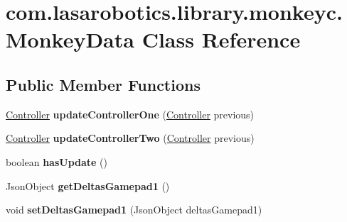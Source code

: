 \hypertarget{classcom_1_1lasarobotics_1_1library_1_1monkeyc_1_1_monkey_data}{}\section{com.\+lasarobotics.\+library.\+monkeyc.\+Monkey\+Data Class Reference}
\label{classcom_1_1lasarobotics_1_1library_1_1monkeyc_1_1_monkey_data}
\subsection*{Public Member Functions}
\begin{DoxyCompactItemize}
\item 
\hypertarget{classcom_1_1lasarobotics_1_1library_1_1monkeyc_1_1_monkey_data_a2fddb34ead2cec3619adeef4988bfb69}{}\hyperlink{classcom_1_1lasarobotics_1_1library_1_1controller_1_1_controller}{Controller} {\bfseries update\+Controller\+One} (\hyperlink{classcom_1_1lasarobotics_1_1library_1_1controller_1_1_controller}{Controller} previous)\label{classcom_1_1lasarobotics_1_1library_1_1monkeyc_1_1_monkey_data_a2fddb34ead2cec3619adeef4988bfb69}

\item 
\hypertarget{classcom_1_1lasarobotics_1_1library_1_1monkeyc_1_1_monkey_data_a3743b8283c0721a212f48c2d3b011e3f}{}\hyperlink{classcom_1_1lasarobotics_1_1library_1_1controller_1_1_controller}{Controller} {\bfseries update\+Controller\+Two} (\hyperlink{classcom_1_1lasarobotics_1_1library_1_1controller_1_1_controller}{Controller} previous)\label{classcom_1_1lasarobotics_1_1library_1_1monkeyc_1_1_monkey_data_a3743b8283c0721a212f48c2d3b011e3f}

\item 
\hypertarget{classcom_1_1lasarobotics_1_1library_1_1monkeyc_1_1_monkey_data_a3552a7d169f51d3e24921a2372ae17ce}{}boolean {\bfseries has\+Update} ()\label{classcom_1_1lasarobotics_1_1library_1_1monkeyc_1_1_monkey_data_a3552a7d169f51d3e24921a2372ae17ce}

\item 
\hypertarget{classcom_1_1lasarobotics_1_1library_1_1monkeyc_1_1_monkey_data_ae802fc3183552c0c4ba86f7f34744929}{}Json\+Object {\bfseries get\+Deltas\+Gamepad1} ()\label{classcom_1_1lasarobotics_1_1library_1_1monkeyc_1_1_monkey_data_ae802fc3183552c0c4ba86f7f34744929}

\item 
\hypertarget{classcom_1_1lasarobotics_1_1library_1_1monkeyc_1_1_monkey_data_a727455c2818da90dea05a74193976808}{}void {\bfseries set\+Deltas\+Gamepad1} (Json\+Object deltas\+Gamepad1)\label{classcom_1_1lasarobotics_1_1library_1_1monkeyc_1_1_monkey_data_a727455c2818da90dea05a74193976808}


\end{DoxyCompactItemize}
